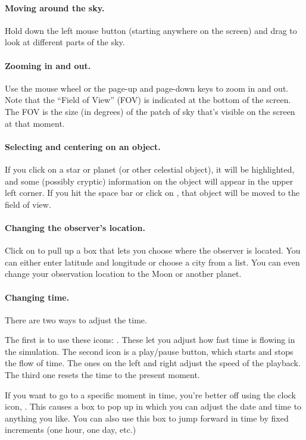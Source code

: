 \paragraph{Moving around the sky.} Hold down the left mouse button
(starting anywhere on the screen) and drag to look at different parts
of the sky.


\paragraph{Zooming in and out.} Use the mouse wheel or the page-up and 
page-down keys to
zoom in and out. Note that the ``Field of View'' (FOV) is indicated
at the bottom of the screen. The FOV is the size (in degrees) of the
patch of sky that's visible on the screen at that moment.

\paragraph{Selecting and centering on an object.}
If you click on a star or planet (or other celestial object), it will
be highlighted, and some (possibly cryptic) information on
the object will appear in the upper left corner. If you hit the
space bar or click on , that object will be moved to the
field of view.

\paragraph{Changing the observer's location.} Click on 
 to pull up a box that lets you
choose where the observer is located. You can either enter latitude
and longitude or choose a city from a list. You can even change your
observation location to the Moon or another planet.

\paragraph{Changing time.} There are two ways to adjust the 
time.

The first is to use these icons: 
. These let you adjust
how fast time is flowing in the simulation.
The second icon is a play/pause button, which starts and stops the flow
of time. The ones on the left and right adjust the speed of the playback.
The third one resets the time to the present moment.

If you want to go to a specific moment in time, you're better off
using the clock icon, . This causes a
box to pop up in which you can adjust the date and time to anything
you like. You can also use this box to jump forward in time by fixed
increments (one hour, one day, etc.)

